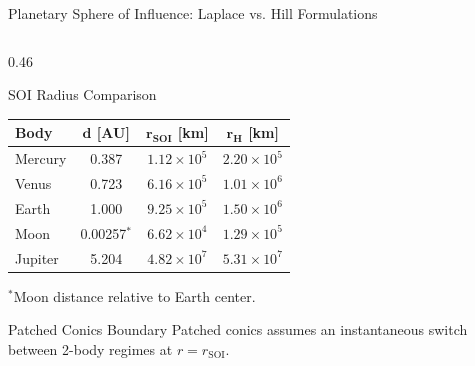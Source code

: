 \documentclass[aspectratio=169, 10pt]{beamer}
\begin{document}
\begin{frame}{Planetary Sphere of Influence: Laplace vs. Hill Formulations}
\begin{columns}[t]
        \begin{column}{0.46\textwidth}
            \begin{block}{SOI Radius Comparison}
                \centering
                \scriptsize
                \setlength{\tabcolsep}{3pt}
                \begin{tabular}{lccc}
                    \toprule
                    \textbf{Body} & $\bm{d}$ \textbf{[AU]} & $\bm{r_{\text{SOI}}}$ \textbf{[km]} & $\bm{r_H}$ \textbf{[km]} \\ \midrule
                    Mercury & 0.387 & $1.12 \times 10^5$ & $2.20 \times 10^5$ \\
                    Venus   & 0.723 & $6.16 \times 10^5$ & $1.01 \times 10^6$ \\
                    Earth   & 1.000 & $9.25 \times 10^5$ & $1.50 \times 10^6$ \\
                    Moon    & 0.00257$^*$ & $6.62 \times 10^4$ & $1.29 \times 10^5$ \\
                    Jupiter & 5.204 & $4.82 \times 10^7$ & $5.31 \times 10^7$ \\ \bottomrule
                \end{tabular}
                \par\vspace{1pt}
                \tiny $^*$Moon distance relative to Earth center.
            \end{block}

            \vspace{-0.1cm}

            \begin{alertblock}{Patched Conics Boundary}
                \scriptsize
                Patched conics assumes an instantaneous switch between 2-body regimes at $r = r_{\text{SOI}}$.
            \end{alertblock}
        \end{column}
    \end{columns}
\end{frame}
\end{document}
